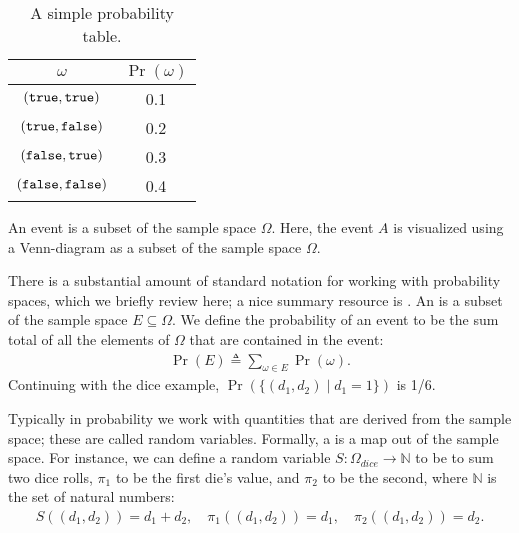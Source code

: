 \documentclass{tufte-handout}
\begin{document}
\begin{table}
    \centering
 \begin{tabular}{c||c}
    \toprule
    $\omega$ & $\Pr(\omega)$ \\
    \midrule 
    $(\texttt{true}, \texttt{true})$ & 0.1 \\ 
    $(\texttt{true}, \texttt{false})$ & 0.2 \\ 
    $(\texttt{false}, \texttt{true})$ & 0.3 \\ 
    $(\texttt{false}, \texttt{false})$ & 0.4 \\ 
    \bottomrule
\end{tabular}
\caption{A simple probability table.}
\label{tbl:simple}
\end{table}

\begin{marginfigure}
        \caption{An event is a subset of the sample space $\Omega$. Here, the event $A$ 
        is visualized using a Venn-diagram as a subset of the sample space $\Omega$.}
\end{marginfigure}

There is a substantial amount of standard notation for working with probability spaces, 
which we briefly review here; a nice summary resource is \citet[Chapter 3]{darwiche2009modeling}.
An  is a subset of the sample space $E \subseteq \Omega$. We define
the probability of an event to be the sum total of all the elements of $\Omega$ that 
are contained in the event:
\begin{align}
    \Pr(E) \triangleq \sum_{\omega \in E} \Pr(\omega).
\end{align}
Continuing with the dice example, $\Pr(\{(d_1,d_2) \mid d_1 = 1\})$ is 1/6.

Typically in probability we work with quantities that are derived from the sample space; 
these are called random variables.
Formally, a  is a map out of the sample space. For instance, we can
define a random variable $S : \Omega_{dice} \rightarrow \mathbb{N}$ to be to sum two dice rolls,
$\pi_1$ to be the first die's value, and $\pi_2$ to be the second,
where $\mathbb{N}$ is the set of natural numbers:
\begin{align}
    S((d_1, d_2)) = d_1 + d_2, \quad \pi_1((d_1, d_2)) = d_1, \quad \pi_2((d_1, d_2)) = d_2.
    \label{eq:rvs}
\end{align}
\end{document}
